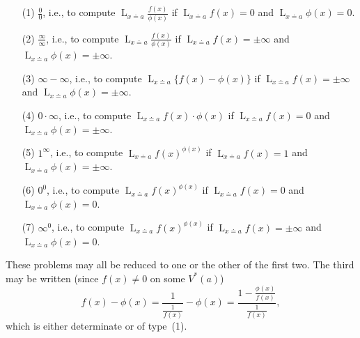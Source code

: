 \documentclass[a4paper,12pt]{book}[2004/02/16]
\providecommand{\hyperlink}[2]{#2}
\providecommand{\hypertarget}[2]{#2}
\theoremstyle{ilemma}
\theoremstyle{itheorem}
\theoremstyle{iother}
\theoremstyle{icorollary}
\theoremstyle{numcorollary}
\theoremstyle{idefinition}
\renewcommand{\dfrac}[2]{\frac{#1}{#2}}%
\begin{document}
\begin{enumerate}
\item[(1)]\hypertarget{case1}{} $\dfrac{0}{0}$, i.e., to compute
$\displaystyle\mathop{L}_{x \doteq a}\frac{f(x)}{\phi(x)}$ if
$\displaystyle\mathop{L}_{x \doteq a}f(x)=0$ and
$\displaystyle\mathop{L}_{x \doteq a}\phi(x)=0$.

\item[(2)]\hypertarget{case2}{} $\dfrac{\infty}{\infty}$, i.e., to compute
$\displaystyle\mathop{L}_{x \doteq a}\frac{f(x)}{\phi(x)}$ if
$\displaystyle\mathop{L}_{x \doteq a}f(x)=\pm\infty$ and
$\displaystyle\mathop{L}_{x \doteq a}\phi(x)=\pm\infty$.

\item[(3)]\hypertarget{case3}{} $\infty-\infty$, i.e., to compute
$\displaystyle\mathop{L}_{x \doteq a}\{f(x)-\phi(x)\}$ if
$\displaystyle\mathop{L}_{x \doteq a}f(x)=\pm\infty$ and
$\displaystyle\mathop{L}_{x \doteq a}\phi(x)=\pm\infty$.

\item[(4)]\hypertarget{case4}{} $0 \cdot \infty$, i.e., to compute
$\displaystyle\mathop{L}_{x \doteq a}f(x)\cdot\phi(x)$ if
$\displaystyle\mathop{L}_{x \doteq a}f(x)=0$ and
$\displaystyle\mathop{L}_{x \doteq a}\phi(x)=\pm\infty$.

\item[(5)]\hypertarget{case5}{} $1^\infty$, i.e., to compute
$\displaystyle\mathop{L}_{x \doteq a}f(x)^{\phi(x)}$ if
$\displaystyle\mathop{L}_{x \doteq a}f(x)=1$ and
$\displaystyle\mathop{L}_{x \doteq a}\phi(x)=\pm\infty$.

\item[(6)]\hypertarget{case6}{} $0^0$, i.e., to compute
$\displaystyle\mathop{L}_{x \doteq a}f(x)^{\phi(x)}$ if
$\displaystyle\mathop{L}_{x \doteq a}f(x)=0$ and
$\displaystyle\mathop{L}_{x \doteq a}\phi(x)=0$.

\item[(7)]\hypertarget{case7}{} $\infty^0$, i.e., to compute
$\displaystyle\mathop{L}_{x \doteq a}f(x)^{\phi(x)}$ if
$\displaystyle\mathop{L}_{x \doteq a}f(x)=\pm\infty$ and
$\displaystyle\mathop{L}_{x \doteq a}\phi(x)=0$.
\end{enumerate}

These problems may all be reduced to one or the other of the first
two. The third may be written (since $f(x)\neq 0$ on some $V^*(a)$)
\[
  f(x)-\phi(x) = \frac{1}{\dfrac{1}{f(x)}}-\phi(x) =
  \frac{1-\dfrac{\phi(x)}{f(x)}}{\dfrac{1}{f(x)}},
\]
which is either determinate or of type~\hyperlink{case1}{(1)}.
\end{document}
